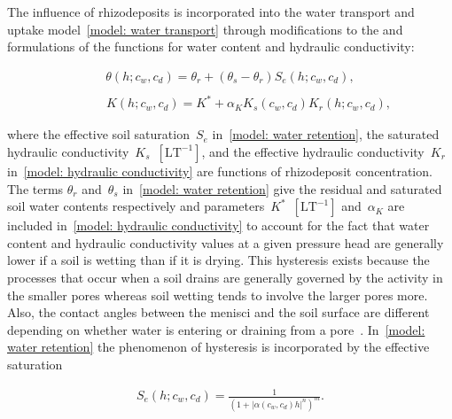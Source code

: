\documentclass[11pt,a4paper]{article}
\numberwithin{equation}{section}
\begin{document}
The influence of rhizodeposits is incorporated into the water transport and uptake model~\eqref{model: water transport} through modifications to the \cite{van1980closed} and \cite{mualem1976new} formulations of the functions for water content and hydraulic conductivity:
\begin{linenomath*}
	\begin{equation}\label{model: water retention}
		\begin{aligned}
			\theta(h; c_w, c_d) = \theta_r + (\theta_s-\theta_r)S_e(h; c_w, c_d),\\
		\end{aligned}
	\end{equation}
	\begin{equation}\label{model: hydraulic conductivity}
		\begin{aligned}
			\qquad \quad K(h; c_w, c_d) = K^* + \alpha_KK_s(c_w, c_d)K_r(h; c_w, c_d),
		\end{aligned}	
	\end{equation}		
\end{linenomath*}
where the effective soil saturation~$S_e$ in~\eqref{model: water retention}, the saturated hydraulic conductivity~$K_s$~$[\text{LT}^{-1}]$, and the effective hydraulic conductivity~$K_r$ in~\eqref{model: hydraulic conductivity} are functions of rhizodeposit concentration. The terms $\theta_r$ and~$\theta_s$ in~\eqref{model: water retention} give the residual and saturated soil water contents respectively and parameters~$K^*$~$[\text{LT}^{-1}]$ and~$\alpha_K$ are included in~\eqref{model: hydraulic conductivity} to account for the fact that 
water content and hydraulic conductivity values at a given pressure head are generally lower if a soil is wetting than if it is drying. This hysteresis exists because the processes that occur when a soil drains are generally governed by the activity in the smaller pores whereas soil wetting tends to involve the larger pores more. Also, the contact angles between the menisci and the soil surface are different depending on whether water is entering or draining from a pore~\citep{van2011hydraulic, zhou2013contact}. In~\eqref{model: water retention} the phenomenon of hysteresis is incorporated by the effective saturation
\begin{linenomath*}
	\begin{equation}\label{model: effective saturation}
		\begin{aligned}
			S_e(h;c_w, c_d)=\frac{1}{(1+|\alpha(c_w, c_d) h|^{n})^{m}}.
		\end{aligned}
	\end{equation}  
\end{linenomath*}
\end{document}
